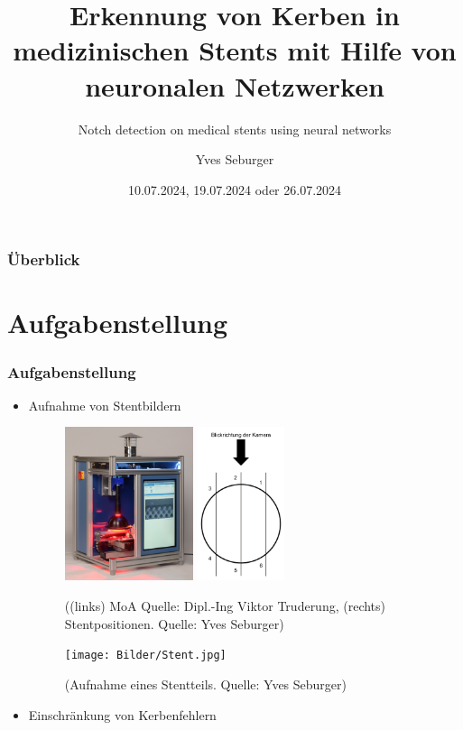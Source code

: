 \documentclass{beamer}
\title{Erkennung von Kerben in medizinischen Stents mit Hilfe von neuronalen Netzwerken}
\subtitle{\small Notch detection on medical stents using neural networks}
\author{Yves Seburger}
\date{10.07.2024, 19.07.2024 oder 26.07.2024}
\institute{Hochschule Kaiserslautern\newline
Schoenstr. 11\newline
67659 Kaiserslautern}
\begin{document}
\frame{\titlepage}

\begin{frame}
\frametitle{Überblick}
\tableofcontents
\end{frame}

\section{Aufgabenstellung}
\begin{frame}[allowframebreaks]
\frametitle{Aufgabenstellung}
\begin{itemize}
    \item Aufnahme von Stentbildern \newline
        \begin{figure}
            \includegraphics[height=4.5cm]{Bilder/MoA_Gesa_preversion_cut.jpg}
            \hspace{20px}
            \includegraphics[height=4.5cm]{Bilder/Stentpositionen.png}
            \caption{((links) MoA Quelle: Dipl.-Ing Viktor Truderung, (rechts) Stentpositionen. Quelle: Yves Seburger)}
        \end{figure}
        \begin{figure}
            \texttt{[image: Bilder/Stent.jpg]}
            \caption{(Aufnahme eines Stentteils. Quelle: Yves Seburger)}
        \end{figure}  
\end{itemize}
\begin{itemize}
    \item Einschränkung von Kerbenfehlern \newline
        \begin{figure}

\end{figure}
\end{itemize}
\end{frame}
\end{document}
